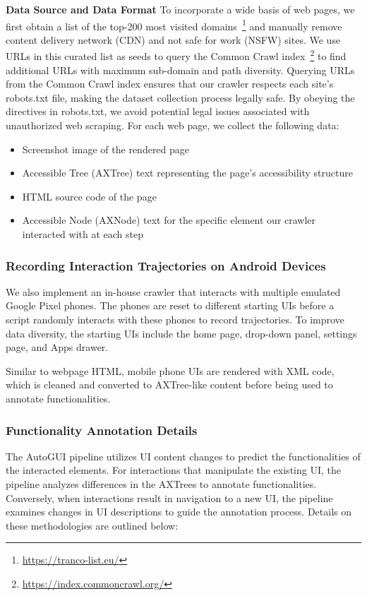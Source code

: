 

\noindent\textbf{Data Source and Data Format}
To incorporate a wide basis of web pages, we first obtain a list of the top-200 most visited domains~\footnote{\url{https://tranco-list.eu/}} and manually remove content delivery network (CDN) and not safe for work (NSFW) sites.
We use URLs in this curated list as seeds to query the Common Crawl index~\footnote{\url{https://index.commoncrawl.org/}} to find additional URLs with maximum sub-domain and path diversity.
Querying URLs from the Common Crawl index ensures that our crawler respects each site's robots.txt file, making the dataset collection process legally safe. 
By obeying the directives in robots.txt, we avoid potential legal issues associated with unauthorized web scraping.
For each web page, we collect the following data:
\begin{itemize}
    \item Screenshot image of the rendered page
    \item Accessible Tree (AXTree) text representing the page's accessibility structure
    \item HTML source code of the page
    \item Accessible Node (AXNode) text for the specific element our crawler interacted with at each step
\end{itemize}


\subsubsection{Recording Interaction Trajectories on Android Devices}
We also implement an in-house crawler that interacts with multiple emulated Google Pixel phones. The phones are reset to different starting UIs before a script randomly interacts with these phones to record trajectories. To improve data diversity, the starting UIs include the home page, drop-down panel, settings page, and Apps drawer.

Similar to webpage HTML, mobile phone UIs are rendered with XML code, which is cleaned and converted to AXTree-like content before being used to annotate functionalities.

\subsubsection{Functionality Annotation Details}
\label{sec:supp:anno details}
The AutoGUI pipeline utilizes UI content changes to predict the functionalities of the interacted elements. For interactions that manipulate the existing UI, the pipeline analyzes differences in the AXTrees to annotate functionalities. Conversely, when interactions result in navigation to a new UI, the pipeline examines changes in UI descriptions to guide the annotation process. Details on these methodologies are outlined below:

